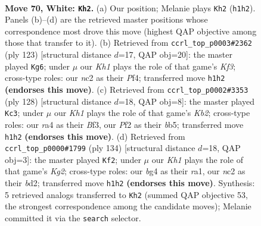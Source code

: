 \documentclass[11pt]{article}
\begin{document}
\clearpage

\begin{figure}[p]\centering
\begin{subfigure}{0.46\textwidth}\centering
\resizebox{\linewidth}{!}{%
\newchessgame
\chessboard[
  setfen={8/8/7k/8/r5bB/6R1/2n2P2/7K w - - 0 70},
  showmover=false,
  pgfstyle=straightmove, color=movearrow, markmove={h1-h2}
]}
\caption{}
\end{subfigure}\hfill
\begin{subfigure}{0.46\textwidth}\centering
\resizebox{\linewidth}{!}{%
\newchessgame
\chessboard[
  setfen={R7/8/5k2/8/5p2/Br6/8/K7 b - - 6 62},
  showmover=false,
  pgfstyle=straightmove, color=movearrow, markmove={f6-g6}
]}
\caption{}
\end{subfigure}
\\[4pt]
\begin{subfigure}{0.46\textwidth}\centering
\resizebox{\linewidth}{!}{%
\newchessgame
\chessboard[
  setfen={1r6/1P6/4R3/1b3n2/8/5B1k/1K6/8 w - - 3 65},
  showmover=false,
  pgfstyle=straightmove, color=movearrow, markmove={b2-c3}
]}
\caption{}
\end{subfigure}\hfill
\begin{subfigure}{0.46\textwidth}\centering
\resizebox{\linewidth}{!}{%
\newchessgame
\chessboard[
  setfen={8/5k2/4R3/5B2/8/5P2/3b2K1/r7 w - - 1 68},
  showmover=false,
  pgfstyle=straightmove, color=movearrow, markmove={g2-f2}
]}
\caption{}
\end{subfigure}
\caption{\textbf{Move 70, White: \texttt{Kh2}.} (a) Our position; Melanie plays \texttt{Kh2} (\texttt{h1h2}). Panels (b)--(d) are the retrieved master positions whose correspondence most drove this move (highest QAP objective among those that transfer to it). (b) Retrieved from \texttt{ccrl\_top\_p0003\#2362} (ply 123) [structural distance $d$=17, QAP obj=20]: the master played \texttt{Kg6}; under $\mu$ our \emph{Kh1} plays the role of that game's \emph{Kf3}; cross-type roles: our \emph{n}c2 as their \emph{P}f4; transferred move \texttt{h1h2} \textbf{(endorses this move)}. (c) Retrieved from \texttt{ccrl\_top\_p0002\#3353} (ply 128) [structural distance $d$=18, QAP obj=8]: the master played \texttt{Kc3}; under $\mu$ our \emph{Kh1} plays the role of that game's \emph{Kb2}; cross-type roles: our \emph{r}a4 as their \emph{B}f3, our \emph{P}f2 as their \emph{b}b5; transferred move \texttt{h1h2} \textbf{(endorses this move)}. (d) Retrieved from \texttt{ccrl\_top\_p0000\#1799} (ply 134) [structural distance $d$=18, QAP obj=3]: the master played \texttt{Kf2}; under $\mu$ our \emph{Kh1} plays the role of that game's \emph{Kg2}; cross-type roles: our \emph{b}g4 as their \emph{r}a1, our \emph{n}c2 as their \emph{b}d2; transferred move \texttt{h1h2} \textbf{(endorses this move)}. Synthesis: 5 retrieved analogs transferred to \texttt{Kh2} (summed QAP objective 53, the strongest correspondence among the candidate moves); Melanie committed it via the \texttt{search} selector.}
\label{fig:thought-m138}
\end{figure}
\end{document}
